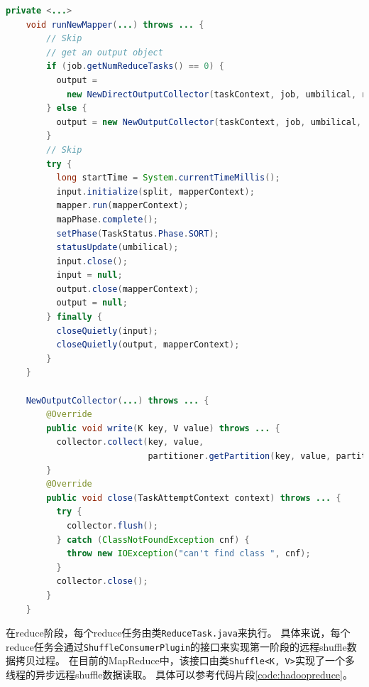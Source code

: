 \begin{lstlisting}[language={Java}, caption={Hadoop MapReduce中map阶段的shuffle写代码片段}, label={code:hadoopmap}]
    private <...>
    void runNewMapper(...) throws ... {
        // Skip
        // get an output object
        if (job.getNumReduceTasks() == 0) {
          output = 
            new NewDirectOutputCollector(taskContext, job, umbilical, reporter);
        } else {
          output = new NewOutputCollector(taskContext, job, umbilical, reporter);
        }
        // Skip    
        try {
          long startTime = System.currentTimeMillis();
          input.initialize(split, mapperContext);
          mapper.run(mapperContext);
          mapPhase.complete();
          setPhase(TaskStatus.Phase.SORT);
          statusUpdate(umbilical);
          input.close();
          input = null;
          output.close(mapperContext);
          output = null;
        } finally {
          closeQuietly(input);
          closeQuietly(output, mapperContext);
        }
    }

    NewOutputCollector(...) throws ... {
        @Override
        public void write(K key, V value) throws ... {
          collector.collect(key, value,
                            partitioner.getPartition(key, value, partitions));
        }
        @Override
        public void close(TaskAttemptContext context) throws ... {
          try {
            collector.flush();
          } catch (ClassNotFoundException cnf) {
            throw new IOException("can't find class ", cnf);
          }
          collector.close();
        }
    }
\end{lstlisting}

在reduce阶段，每个reduce任务由类\verb|ReduceTask.java|来执行。
具体来说，每个reduce任务会通过\verb|ShuffleConsumerPlugin|的接口来实现第一阶段的远程shuffle数据拷贝过程。
在目前的MapReduce中，该接口由类\verb|Shuffle<K, V>|实现了一个多线程的异步远程shuffle数据读取。
具体可以参考代码片段\ref{code:hadoopreduce}。

